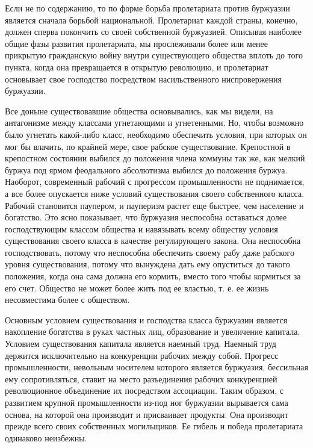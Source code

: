 \documentclass[12pt]{article}
\newcommand{\parnum}{(\arabic{parcount})}
\newcounter{parcount}
\newenvironment{parnumbers}{%
  \par%
  \everypar{\noindent \stepcounter{parcount}\marginpar[]{\parnum}}%
}{}
\begin{document}
\begin{parnumbers}
    Если не по содержанию, то по форме борьба пролетариата против буржуазии является сначала борьбой национальной. Пролетариат каждой страны, конечно, должен сперва покончить со своей собственной буржуазией. Описывая наиболее общие фазы развития пролетариата, мы прослеживали более или менее прикрытую гражданскую войну внутри существующего общества вплоть до того пункта, когда она превращается в открытую революцию, и пролетариат основывает свое господство посредством насильственного ниспровержения буржуазии.

    Все доныне существовавшие общества основывались, как мы видели, на антагонизме между классами угнетающими и угнетенными. Но, чтобы возможно было угнетать какой-либо класс, необходимо обеспечить условия, при которых он мог бы влачить, по крайней мере, свое рабское существование. Крепостной в крепостном состоянии выбился до положения члена коммуны так же, как мелкий буржуа под ярмом феодального абсолютизма выбился до положения буржуа. Наоборот, современный рабочий с прогрессом промышленности не поднимается, а все более опускается ниже условий существования своего собственного класса. Рабочий становится паупером, и пауперизм растет еще быстрее, чем население и богатство. Это ясно показывает, что буржуазия неспособна оставаться долее господствующим классом общества и навязывать всему обществу условия существования своего класса в качестве регулирующего закона. Она неспособна господствовать, потому что неспособна обеспечить своему рабу даже рабского уровня существования, потому что вынуждена дать ему опуститься до такого положения, когда она сама должна его кормить, вместо того чтобы кормиться за его счет. Общество не может более жить под ее властью, т. е. ее жизнь несовместима более с обществом.

    Основным условием существования и господства класса буржуазии является накопление богатства в руках частных лиц, образование и увеличение капитала. Условием существования капитала является наемный труд. Наемный труд держится исключительно на конкуренции рабочих между собой. Прогресс промышленности, невольным носителем которого является буржуазия, бессильная ему сопротивляться, ставит на место разъединения рабочих конкуренцией революционное объединение их посредством ассоциации. Таким образом, с развитием крупной промышленности из-под ног буржуазии вырывается сама основа, на которой она производит и присваивает продукты. Она производит прежде всего своих собственных могильщиков. Ее гибель и победа пролетариата одинаково неизбежны.
\end{parnumbers}
\end{document}
